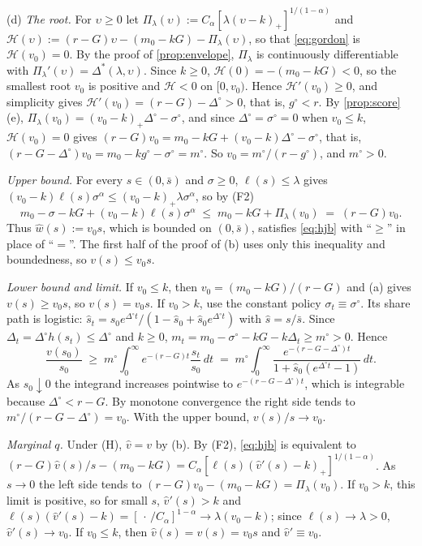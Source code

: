 (d) \emph{The root.} For $\upsilon\ge 0$ let $\Pi_\lambda(\upsilon):=C_\alpha[\lambda(\upsilon-k)_+]^{1/(1-\alpha)}$ and $\mathcal H(\upsilon):=(r-G)\upsilon-(m_0-kG)-\Pi_\lambda(\upsilon)$, so that \eqref{eq:gordon} is $\mathcal H(v_0)=0$. By the proof of \autoref{prop:envelope}, $\Pi_\lambda$ is continuously differentiable with $\Pi_\lambda'(\upsilon)=\Delta^*(\lambda,\upsilon)$. Since $k\ge 0$, $\mathcal H(0)=-(m_0-kG)<0$, so the smallest root $v_0$ is positive and $\mathcal H<0$ on $[0,v_0)$. Hence $\mathcal H'(v_0)\ge 0$, and simplicity gives $\mathcal H'(v_0)=(r-G)-\Delta^\circ>0$, that is, $g^\circ<r$. By \autoref{prop:score}(e), $\Pi_\lambda(v_0)=(v_0-k)_+\Delta^\circ-\sigma^\circ$, and since $\Delta^\circ=\sigma^\circ=0$ when $v_0\le k$, $\mathcal H(v_0)=0$ gives $(r-G)v_0=m_0-kG+(v_0-k)\Delta^\circ-\sigma^\circ$, that is, $(r-G-\Delta^\circ)v_0=m_0-kg^\circ-\sigma^\circ=m^\circ$. So $v_0=m^\circ/(r-g^\circ)$, and $m^\circ>0$.

\emph{Upper bound.} For every $s\in(0,\bar s)$ and $\sigma\ge 0$, $\ell(s)\le\lambda$ gives $(v_0-k)\ell(s)\sigma^{\alpha}\le(v_0-k)_+\lambda\sigma^{\alpha}$, so by (F2)
\[
m_0-\sigma-kG+(v_0-k)\ell(s)\sigma^{\alpha}\;\le\;m_0-kG+\Pi_\lambda(v_0)\;=\;(r-G)v_0 .
\]
Thus $\hat w(s):=v_0s$, which is bounded on $(0,\bar s)$, satisfies \eqref{eq:hjb} with ``$\ge$'' in place of ``$=$''. The first half of the proof of (b) uses only this inequality and boundedness, so $v(s)\le v_0s$.

\emph{Lower bound and limit.} If $v_0\le k$, then $v_0=(m_0-kG)/(r-G)$ and (a) gives $v(s)\ge v_0s$, so $v(s)=v_0s$. If $v_0>k$, use the constant policy $\sigma_t\equiv\sigma^\circ$. Its share path is logistic: $\hat s_t=\hat s_0e^{\Delta^\circ t}/(1-\hat s_0+\hat s_0e^{\Delta^\circ t})$ with $\hat s=s/\bar s$. Since $\Delta_t=\Delta^\circ h(s_t)\le\Delta^\circ$ and $k\ge 0$, $m_t=m_0-\sigma^\circ-kG-k\Delta_t\ge m^\circ>0$. Hence
\[
\frac{v(s_0)}{s_0}\;\ge\;m^\circ\int_0^\infty e^{-(r-G)t}\frac{s_t}{s_0}\,dt\;=\;m^\circ\int_0^\infty\frac{e^{-(r-G-\Delta^\circ)t}}{1+\hat s_0(e^{\Delta^\circ t}-1)}\,dt .
\]
As $s_0\downarrow 0$ the integrand increases pointwise to $e^{-(r-G-\Delta^\circ)t}$, which is integrable because $\Delta^\circ<r-G$. By monotone convergence the right side tends to $m^\circ/(r-G-\Delta^\circ)=v_0$. With the upper bound, $v(s)/s\to v_0$.

\emph{Marginal $q$.} Under (H), $\hat v=v$ by (b). By (F2), \eqref{eq:hjb} is equivalent to $(r-G)\hat v(s)/s-(m_0-kG)=C_\alpha[\ell(s)(\hat v'(s)-k)_+]^{1/(1-\alpha)}$. As $s\to 0$ the left side tends to $(r-G)v_0-(m_0-kG)=\Pi_\lambda(v_0)$. If $v_0>k$, this limit is positive, so for small $s$, $\hat v'(s)>k$ and $\ell(s)(\hat v'(s)-k)=[\,\cdot\,/C_\alpha]^{1-\alpha}\to\lambda(v_0-k)$; since $\ell(s)\to\lambda>0$, $\hat v'(s)\to v_0$. If $v_0\le k$, then $\hat v(s)=v(s)=v_0s$ and $\hat v'\equiv v_0$.

